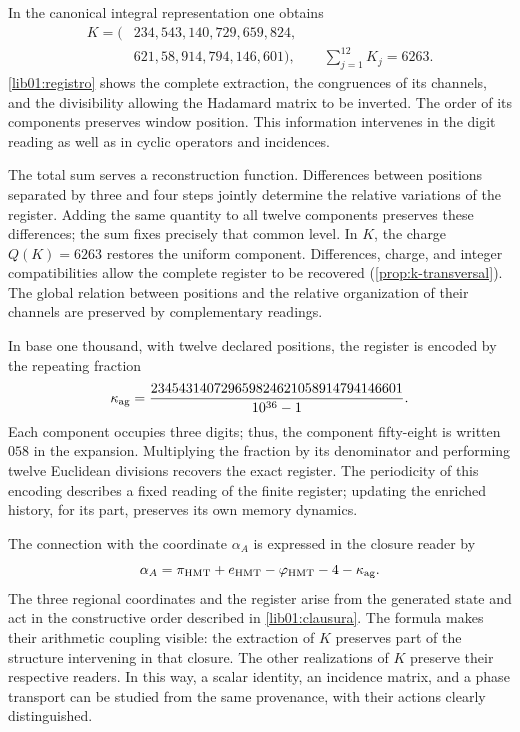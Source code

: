 In the canonical integral representation one obtains
\[
 \begin{aligned}
 K=\bigl(&234,543,140,729,659,824,\\
         &621,58,914,794,146,601\bigr),
 \qquad\sum_{j=1}^{12}K_j=6263.
 \end{aligned}
\]
\cref{lib01:registro} shows the complete extraction, the
congruences of its channels, and the divisibility allowing the Hadamard
matrix to be inverted. The order of its components preserves
window position. This information intervenes in the digit
reading as well as in cyclic operators and incidences.

The total sum serves a reconstruction function. Differences
between positions separated by three and four steps jointly
determine the relative variations of the register. Adding the same
quantity to all twelve components preserves these differences; the sum fixes
precisely that common level. In \(K\), the charge \(Q(K)=6263\)
restores the uniform component. Differences, charge, and integer
compatibilities allow the complete register to be recovered
(\cref{prop:k-transversal}). The global relation between positions and
the relative organization of their channels are preserved by
complementary readings.

In base one thousand, with twelve declared positions, the register is encoded
by the repeating fraction
\[
 \kappa_{\rm ag}=
 \frac{234543140729659824621058914794146601}{10^{36}-1}.
\]
Each component occupies three digits; thus, the component fifty-eight
is written \(058\) in the expansion. Multiplying the fraction
by its denominator and performing twelve Euclidean divisions recovers the
exact register. The periodicity of this encoding describes a
fixed reading of the finite register; updating the enriched
history, for its part, preserves its own memory dynamics.

The connection with the coordinate \(\alpha_A\) is expressed in the
closure reader by
\[
 \alpha_A=
 \pi_{\rm HMT}+e_{\rm HMT}-\varphi_{\rm HMT}-4-\kappa_{\rm ag}.
\]
The three regional coordinates and the register arise from the generated
state and act in the constructive order described in
\cref{lib01:clausura}. The formula makes their arithmetic coupling
visible: the extraction of \(K\) preserves part of the
structure intervening in that closure. The other realizations
of \(K\) preserve their respective readers. In this way, a
scalar identity, an incidence matrix, and a phase transport
can be studied from the same provenance, with their actions
clearly distinguished.

